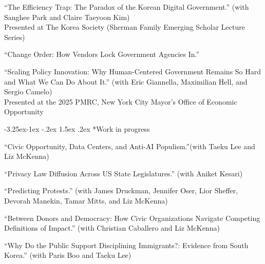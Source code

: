 \documentclass[10pt, letterpaper]{article}
\makeatletter
\renewcommand\subsection{\@startsection{subsection}{2}{\z@}%
  {-3.25ex\@plus -1ex \@minus -.2ex}%
  {1.5ex \@plus .2ex}%
  {\normalfont\large\bfseries\color{cvnavy}}}
\makeatother
\begin{document}
\begin{etaremune}
\item ``The Efficiency Trap: The Paradox of the Korean Digital Government.'' (with Sanghee Park and Claire Taeyoon Kim) \\ Presented at The Korea Society (Sherman Family Emerging Scholar Lecture Series)

\item ``Change Order: How Vendors Lock Government Agencies In.''

\item ``Scaling Policy Innovation: Why Human-Centered Government Remains So Hard and What We Can Do About It.'' (with Eric Giannella, Maximilian Hell, and Sergio Camelo) 
\\ Presented at the 2025 PMRC, New York City Mayor's Office of Economic Opportunity

\end{etaremune}

\subsection*{Work in progress}

\begin{etaremune}


\item ``Civic Opportunity, Data Centers, and Anti-AI Populism.''(with Taeku Lee and Liz McKenna)

\item ``Privacy Law Diffusion Across US State Legislatures.'' (with Aniket Kesari)

\item ``Predicting Protests.'' (with James Druckman, Jennifer Oser, Lior Sheffer, Devorah Manekin, Tamar Mitts, and Liz McKenna)

\item ``Between Donors and Democracy: How Civic Organizations Navigate Competing Definitions of Impact.'' (with Christian Caballero and Liz McKenna)


\item ``Why Do the Public Support Disciplining Immigrants?: Evidence from South Korea.'' (with Paris Boo and Taeku Lee)


\end{etaremune}
\end{document}
